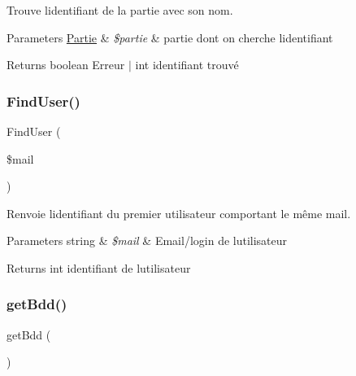 Trouve l\textquotesingle{}identifiant de la partie avec son nom. 


\begin{DoxyParams}[1]{Parameters}
\mbox{\hyperlink{class_partie}{Partie}} & {\em \$partie} & partie dont on cherche l\textquotesingle{}identifiant\\
\hline
\end{DoxyParams}
\begin{DoxyReturn}{Returns}
boolean Erreur $\vert$ int identifiant trouvé 
\end{DoxyReturn}
\mbox{\label{class_interface_b_d_d_a8d979cbd1ec04e6ad7c3fed4d767e5a6}} 
\subsubsection{\texorpdfstring{Find\+User()}{FindUser()}}
{\footnotesize\ttfamily Find\+User (\begin{DoxyParamCaption}\item[{}]{\$mail }\end{DoxyParamCaption})}



Renvoie l\textquotesingle{}identifiant du premier utilisateur comportant le même mail. 


\begin{DoxyParams}[1]{Parameters}
string & {\em \$mail} & Email/login de l\textquotesingle{}utilisateur\\
\hline
\end{DoxyParams}
\begin{DoxyReturn}{Returns}
int identifiant de l\textquotesingle{}utilisateur 
\end{DoxyReturn}
\mbox{\label{class_interface_b_d_d_af3c2403a2cce83d85a2e494534115ddb}} 
\subsubsection{\texorpdfstring{get\+Bdd()}{getBdd()}}
{\footnotesize\ttfamily get\+Bdd (\begin{DoxyParamCaption}{ }\end{DoxyParamCaption})}




